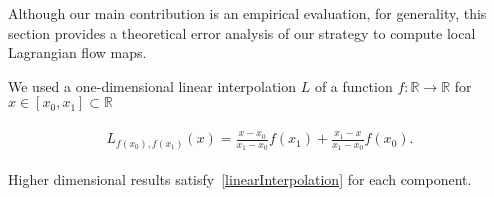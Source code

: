 %
Although our main contribution is an empirical evaluation, for generality, this section provides a theoretical error analysis of our strategy to compute local Lagrangian flow maps.
%

We used a one-dimensional linear interpolation $L$ of a function $f:\mathbb R\to \mathbb R$ for $x\in[x_0,x_1]\subset\mathbb R$
%
\begin{footnotesize}
\begin{eqnarray}
\begin{aligned}\label{linearInterpolation}
L_{f(x_0),f(x_1)}(x) = \frac{x-x_0}{x_1-x_0}f(x_1) + \frac{x_1-x}{x_1-x_0}f(x_0).
\end{aligned}
\end{eqnarray}
\end{footnotesize}
%
Higher dimensional results satisfy~\eqref{linearInterpolation} for each component.

